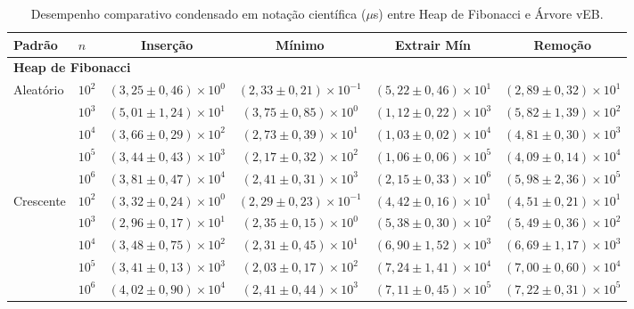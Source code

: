 \documentclass[12pt,a4paper]{report}
\begin{document}
\begin{table}[htbp]
  \centering
  \caption{Desempenho comparativo condensado em notação científica ($\mu$s) entre Heap de Fibonacci e Árvore vEB.}
  \label{tab:resultados-estudo1}
  \footnotesize
  \setlength{\tabcolsep}{5pt}
  \renewcommand{\arraystretch}{1.08}
  \begin{tabular}{llcccc}
    \toprule
    \textbf{Padrão} & \textbf{$n$} & \textbf{Inserção} & \textbf{Mínimo} & \textbf{Extrair Mín} & \textbf{Remoção} \\
    \midrule
    \multicolumn{6}{l}{\textbf{Heap de Fibonacci}} \\
    \midrule
    \multirow{5}{*}{Aleatório} & $10^{2}$ & $(3,25 \pm 0,46) \times 10^{0}$ & $(2,33 \pm 0,21) \times 10^{-1}$ & $(5,22 \pm 0,46) \times 10^{1}$ & $(2,89 \pm 0,32) \times 10^{1}$ \\
     & $10^{3}$ & $(5,01 \pm 1,24) \times 10^{1}$ & $(3,75 \pm 0,85) \times 10^{0}$ & $(1,12 \pm 0,22) \times 10^{3}$ & $(5,82 \pm 1,39) \times 10^{2}$ \\
     & $10^{4}$ & $(3,66 \pm 0,29) \times 10^{2}$ & $(2,73 \pm 0,39) \times 10^{1}$ & $(1,03 \pm 0,02) \times 10^{4}$ & $(4,81 \pm 0,30) \times 10^{3}$ \\
     & $10^{5}$ & $(3,44 \pm 0,43) \times 10^{3}$ & $(2,17 \pm 0,32) \times 10^{2}$ & $(1,06 \pm 0,06) \times 10^{5}$ & $(4,09 \pm 0,14) \times 10^{4}$ \\
     & $10^{6}$ & $(3,81 \pm 0,47) \times 10^{4}$ & $(2,41 \pm 0,31) \times 10^{3}$ & $(2,15 \pm 0,33) \times 10^{6}$ & $(5,98 \pm 2,36) \times 10^{5}$ \\
    \cmidrule{2-6}
    \multirow{5}{*}{Crescente} & $10^{2}$ & $(3,32 \pm 0,24) \times 10^{0}$ & $(2,29 \pm 0,23) \times 10^{-1}$ & $(4,42 \pm 0,16) \times 10^{1}$ & $(4,51 \pm 0,21) \times 10^{1}$ \\
     & $10^{3}$ & $(2,96 \pm 0,17) \times 10^{1}$ & $(2,35 \pm 0,15) \times 10^{0}$ & $(5,38 \pm 0,30) \times 10^{2}$ & $(5,49 \pm 0,36) \times 10^{2}$ \\
     & $10^{4}$ & $(3,48 \pm 0,75) \times 10^{2}$ & $(2,31 \pm 0,45) \times 10^{1}$ & $(6,90 \pm 1,52) \times 10^{3}$ & $(6,69 \pm 1,17) \times 10^{3}$ \\
     & $10^{5}$ & $(3,41 \pm 0,13) \times 10^{3}$ & $(2,03 \pm 0,17) \times 10^{2}$ & $(7,24 \pm 1,41) \times 10^{4}$ & $(7,00 \pm 0,60) \times 10^{4}$ \\
     & $10^{6}$ & $(4,02 \pm 0,90) \times 10^{4}$ & $(2,41 \pm 0,44) \times 10^{3}$ & $(7,11 \pm 0,45) \times 10^{5}$ & $(7,22 \pm 0,31) \times 10^{5}$ \\

\end{tabular}
\end{table}
\end{document}
